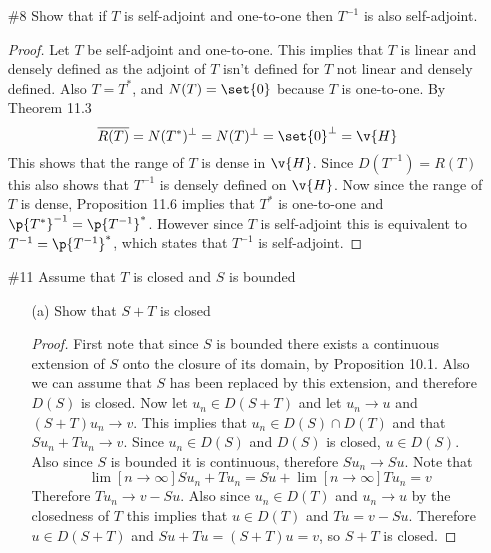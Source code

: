 \documentclass[11pt, oneside]{article}
\begin{document}
\begin{enumerate}
  \pagebreak
  \item[\#8] %
    Show that if $T$ is self-adjoint and one-to-one then $T^{-1}$ is also
    self-adjoint.

    \begin{proof}
      Let $T$ be self-adjoint and one-to-one.
      This implies that $T$ is linear and densely defined as the adjoint of $T$
      isn't defined for $T$ not linear and densely defined.
      Also $T = T^*$, and $N(T) = \set{0}$ because $T$ is one-to-one.
      By Theorem 11.3
      \[
        \overline{R(T)} = N(T^*)^{\perp} = N(T)^{\perp} = \set{0}^{\perp} = \v{H}
      \]
      This shows that the range of $T$ is dense in $\v{H}$.
      Since $D(T^{-1}) = R(T)$ this also shows that $T^{-1}$ is densely defined
      on $\v{H}$.
      Now since the range of $T$ is dense, Proposition 11.6 implies that
      $T^*$ is one-to-one and $\p{T^*}^{-1} = \p{T^{-1}}^*$.
      However since $T$ is self-adjoint this is equivalent to
      $T^{-1} = \p{T^{-1}}^*$, which states that $T^{-1}$ is self-adjoint.
    \end{proof}

  \pagebreak
  \item[\#11]
    Assume that $T$ is closed and $S$ is bounded
    \begin{enumerate}
      \item[(a)]
        Show that $S + T$ is closed

        \begin{proof}
          First note that since $S$ is bounded there exists a continuous
          extension of $S$ onto the closure of its domain, by Proposition 10.1.
          Also we can assume that $S$ has been replaced by this extension, and
          therefore $D(S)$ is closed.
          Now let $u_n \in D(S + T)$ and let $u_n \to u$ and $(S + T)u_n \to v$.
          This implies that $u_n \in D(S) \cap D(T)$ and that $Su_n + Tu_n \to v$.
          Since $u_n \in D(S)$ and $D(S)$ is closed, $u \in D(S)$.
          Also since $S$ is bounded it is continuous, therefore $Su_n \to Su$.
          Note that
          \[
            \lim[n \to \infty]{Su_n + Tu_n} = Su + \lim[n \to \infty]{Tu_n} = v
          \]
          Therefore $Tu_n \to v - Su$.
          Also since $u_n \in D(T)$ and $u_n \to u$ by the closedness of $T$
          this implies that $u \in D(T)$ and $Tu = v - Su$.
          Therefore $u \in D(S + T)$ and $Su + Tu = (S + T)u = v$, so $S + T$
          is closed.
        \end{proof}


\end{enumerate}
\end{enumerate}
\end{document}
